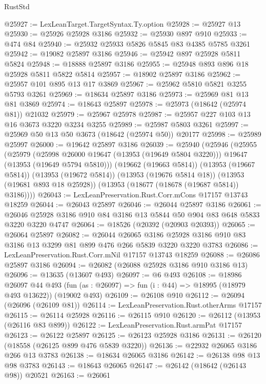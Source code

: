 \begin{lexlean}{RustStd}
\begin{coremodule}
@25927 := LexLeanTarget.TargetSyntax.Ty.option
@25928 := @25927 @13
@25930 := @25926 @25928 @3186
@25932 := @25930 @897 @910
@25933 := @474 @84
@25940 := @25932 @25933 @5826 @5845 @83 @4385 @5785 @3261
@25942 := @19082 @25897 @3186
@25946 := @25942 @897 @25928 @5811 @5824
@25948 := @18888 @25897 @3186
@25955 := @25948 @893 @896 @18 @25928 @5811 @5822 @5814
@25957 := @18902 @25897 @3186
@25962 := @25957 @101 @895 @13 @17 @3869
@25967 := @25962 @5810 @5821 @3255 @5793 @3261
@25969 := @18634 @25897 @3186
@25973 := @25969 @81 @13 @81 @3869
@25974 := @18643 @25897
@25978 := @25973 (@18642 (@25974 @81)) @21032
@25979 := @25967 @25978
@25987 := @25957 @227 @103 @13 @16 @3673 @3220 @3234 @3255
@25989 := @25987 @5803 @3261
@25997 := @25969 @50 @13 @50 @3673 (@18642 (@25974 @50)) @20177
@25998 := @25989 @25997
@26000 := @19642 @25897 @3186
@26039 := @25940
    (@25946
      (@25955
        (@25979
          (@25998 @26000 @19647 (@13953 (@19649 @5804 @3220)))
          @19647
          (@13953 (@19649 @5794 @5810)))
        (@19662 (@19663 @5814))
        (@13953 (@19667 @5814))
        (@13953 (@19672 @5814))
        (@13953 (@19676 @5814 @18))
        (@13953 (@19681 @893 @18 @25928))
        (@13953 (@18677 (@18678 (@19687 @5814)) @3186))))
@26043 := LexLeanPreservation.Rust.Corr.mCons @17157 @13743 @18259
@26044 := @26043 @25897
@26046 := @26044 @25897 @3186
@26061 := @26046 @25928 @3186 @910 @84 @3186 @13 @5844 @50 @904 @83 @648 @5833 @3220 @3220 @4747
@26064 := @18526 (@20392 (@20903 @20393))
@26065 := @26064 @25897
@26082 := @26044
    @26065
    @3186
    @25928
    @3186
    @910
    @83
    @3186
    @13
    @3299
    @81
    @899
    @476
    @266
    @5839
    @3220
    @3220
    @3783
@26086 := LexLeanPreservation.Rust.Corr.mNil @17157 @13743 @18259
@26088 := @26086 @25897 @3186
@26094 := @26082 (@26088 @25928 @3186 @910 @3186 @13)
@26096 := @13635 (@13607 @493)
@26097 := @6 @493
@26108 := @18986
    @26097
    @44
    @493
    (fun (as : @26097) => fun (i : @44) => @18995 (@18979 @493 @13622))
    (@19002 @493)
@26109 := @26108 @910
@26112 := @26094 (@26096 (@26109 @81))
@26114 := LexLeanPreservation.Rust.otherArms @17157
@26115 := @26114 @25928
@26116 := @26115 @910
@26120 := @26112 (@13953 (@26116 @83 @899))
@26122 := LexLeanPreservation.Rust.armPat @17157
@26123 := @26122 @25897
@26125 := @26123 @25928 @3186
@26131 := @26120 (@18558 (@26125 @899 @476 @5839 @3220))
@26136 := @22932 @26065 @3186 @266 @13 @3783
@26138 := @18634 @26065 @3186
@26142 := @26138 @98 @13 @98 @3783
@26143 := @18643 @26065
@26147 := @26142 (@18642 (@26143 @98)) @20521
@26163 := @26061

\end{coremodule}
\end{lexlean}
